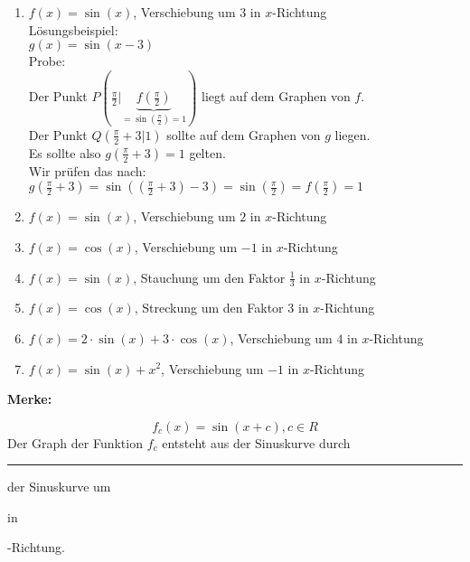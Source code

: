 \documentclass[11pt]{article}
\begin{document}
\begin{enumerate}[label=(\alph*)]
\item $f(x)=\sin(x)$, Verschiebung um $3$ in $x$-Richtung \\
L\"osungsbeispiel: \\
$g(x)=\sin(x-3)$ \\
Probe: \\
Der Punkt $P( \frac{\pi}{2} | \underbrace{ f\left( \frac{\pi}{2} \right) }_{ = \sin\left( \frac{\pi}{2} \right) = 1  })$ liegt auf dem Graphen von $f$. \\
Der Punkt $Q\left( \frac{\pi}{2} + 3 |  1 \right)$ sollte auf dem Graphen von $g$ liegen. \\
Es sollte also $g\left( \frac{\pi}{2} + 3 \right) =  1 $ gelten. \\
Wir pr\"ufen das nach: \\
$g\left( \frac{\pi}{2} + 3 \right) = \sin\left( \left( \frac{\pi}{2} + 3 \right) - 3 \right) = \sin\left( \frac{\pi}{2} \right) = f\left( \frac{\pi}{2} \right) = 1  $
\item $f(x)= \sin(x)$, Verschiebung um $2$ in $x$-Richtung
\item $f(x) = \cos(x)$, Verschiebung um $-1$ in $x$-Richtung
\item $f(x)= \sin(x)$, Stauchung um den Faktor $\frac{1}{3}$ in $x$-Richtung
\item $f(x) = \cos(x)$, Streckung um den Faktor $3$ in $x$-Richtung
\item $f(x) = 2 \cdot \sin(x) + 3 \cdot \cos(x) $, Verschiebung um $4$ in $x$-Richtung
\item $f(x) = \sin(x) + x^2$, Verschiebung um $-1$ in $x$-Richtung
\end{enumerate}

\textbf{Merke:}

$$f_c\left(x\right) = \sin\left(x+c\right), c \in R $$
Der Graph der Funktion $f_c$ entsteht aus der Sinuskurve durch \rule{4cm}{.4pt} der Sinuskurve um \rule{0,5cm}{.4pt} in \rule{0,5cm}{.4pt}-Richtung. 
\end{document}
